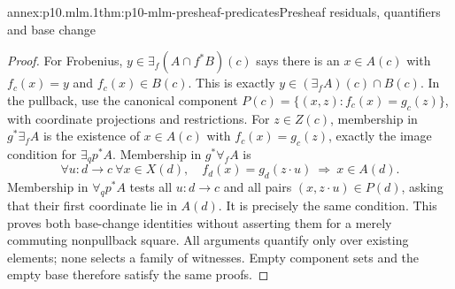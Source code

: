 \begin{annexitem}{annex:p10.mlm.1}{thm:p10-mlm-presheaf-predicates}{Presheaf residuals, quantifiers and base change}
\begin{proof}
For Frobenius, \(y\in\exists_f(A\cap f^*B)(c)\) says there is an \(x\in A(c)\)
with \(f_c(x)=y\) and \(f_c(x)\in B(c)\). This is exactly
\(y\in(\exists_f A)(c)\cap B(c)\).
In the pullback, use the canonical component
\(P(c)=\{(x,z):f_c(x)=g_c(z)\}\), with coordinate projections and restrictions.
For \(z\in Z(c)\), membership in \(g^*\exists_f A\) is the existence of
\(x\in A(c)\) with \(f_c(x)=g_c(z)\), exactly the image condition for
\(\exists_qp^*A\). Membership in \(g^*\forall_f A\) is
\[
 \forall u:d\to c\ \forall x\in X(d),\quad
 f_d(x)=g_d(z\cdot u)\ \Longrightarrow\ x\in A(d).
\]
Membership in \(\forall_qp^*A\) tests all \(u:d\to c\) and all pairs
\((x,z\cdot u)\in P(d)\), asking that their first coordinate lie in \(A(d)\).
It is precisely the same condition. This proves both base-change identities
without asserting them for a merely commuting nonpullback square.
All arguments quantify only over existing elements; none selects a family of
witnesses. Empty component sets and the empty base therefore satisfy the
same proofs.
\end{proof}
\end{annexitem}

